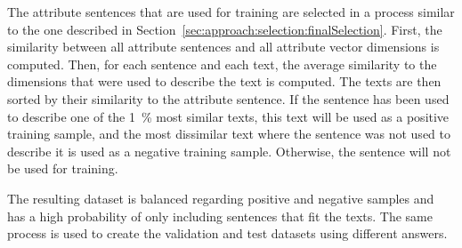 The attribute sentences that are used for training are selected in a process similar to the one described in Section~\ref{sec:approach:selection:finalSelection}.
First, the similarity between all attribute sentences and all attribute vector dimensions is computed. Then, for each sentence and each text, the average similarity to the dimensions that were used to describe the text is computed. The texts are then sorted by their similarity to the attribute sentence. If the sentence has been used to describe one of the \SI{1}{\percent} most similar texts, this text will be used as a positive training sample, and the most dissimilar text where the sentence was not used to describe it is used as a negative training sample. Otherwise, the sentence will not be used for training.

The resulting dataset is balanced regarding positive and negative samples and has a high probability of only including sentences that fit the texts. %
The same process is used to create the validation and test datasets using different answers. %

